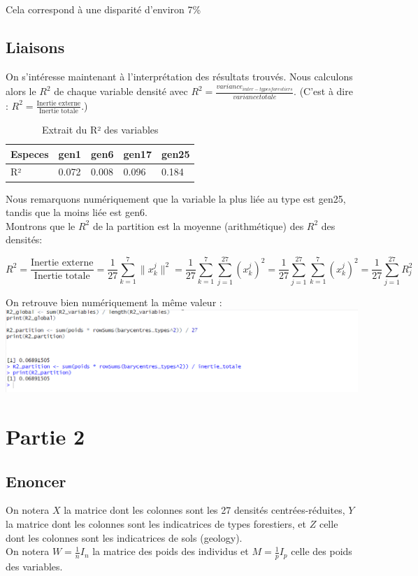 \documentclass{article}
\begin{document}
Cela correspond à une disparité d'environ 7\%

\subsection{Liaisons}

On s'intéresse maintenant à l'interprétation des résultats trouvés. Nous calculons alors le \( R^2 \) de chaque variable densité avec $R^2 = \frac{variance_{inter -typesforestiers}}{variance totale}$.
(C'est à dire : \( R^2 = \frac{\text{Inertie externe}}{\text{Inertie totale}} \).)

\begin{table}[H]
    \centering
    \begin{tabular}{|l|l|l|l|l|}
    \hline
    Especes & gen1  & gen6  & gen17 & gen25 \\ \hline
    R²      & 0.072 & 0.008 & 0.096 & 0.184 \\ \hline
    \end{tabular}
    \centering
    \caption{Extrait du R² des variables}
    \label{tab:statistiques Partie1 a rap avec II.1.b}
\end{table}


    Nous remarquons numériquement que la variable la plus liée au type est gen25, tandis que la moins liée est gen6. 
    \\
    Montrons que le \( R^2 \) de la partition est la moyenne (arithmétique) des \( R^2 \) des densités:

\[
R^2 = \frac{\text{Inertie externe}}{\text{Inertie totale}}
= \frac{1}{27} \sum_{k=1}^{7} \lVert x_k^j \rVert^2
= \frac{1}{27} \sum_{k=1}^{7} \sum_{j=1}^{27} (x_k^j)^2
= \frac{1}{27} \sum_{j=1}^{27} \sum_{k=1}^{7} (x_k^j)^2
= \frac{1}{27} \sum_{j=1}^{27} R_j^2
\]

On retrouve bien numériquement la même valeur :
\\
\includegraphics[width=1.5\textwidth]{preuve_info_p1.png}

\newpage
\section{Partie 2}
\subsection{Enoncer}
On notera $X$ la matrice dont les colonnes sont les 27 densités centrées-réduites, $Y$ la
matrice dont les colonnes sont les indicatrices de types forestiers, et $Z$ celle dont les
colonnes sont les indicatrices de sols (geology). \\
On notera $W=\frac{1}{n}I_n$ la matrice des poids des individus et $M=\frac{1}{p}I_p$
celle des poids des variables.
\end{document}
